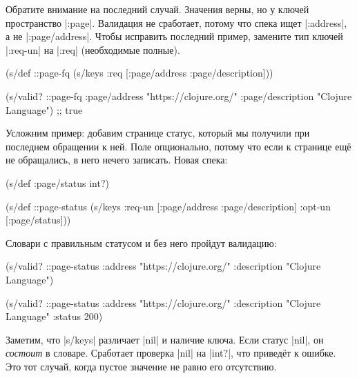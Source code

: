 Обратите внимание на последний случай. Значения верны, но у ключей пространство
\spverb|:page|. Валидация не сработает, потому что спека ищет \spverb|:address|,
а не \spverb|:page/address|. Чтобы исправить последний пример, замените тип
ключей \spverb|:req-un| на \spverb|:req| (необходимые полные).


\begin{english}
  \begin{clojure}
(s/def ::page-fq
  (s/keys :req [:page/address
                :page/description]))

(s/valid? ::page-fq
          {:page/address "https://clojure.org/"
           :page/description "Clojure Language"})
;; true
  \end{clojure}
\end{english}

Усложним пример: добавим странице статус, который мы получили при
последнем обращении к ней. Поле опционально, потому что если к странице ещ\"{е} не
обращались, в него нечего записать. Новая спека:

\begin{english}
  \begin{clojure}
(s/def :page/status int?)

(s/def ::page-status
  (s/keys :req-un [:page/address
                   :page/description]
          :opt-un [:page/status]))
  \end{clojure}
\end{english}

\noindent
Словари с правильным статусом и без него пройдут валидацию:

\begin{english}
  \begin{clojure}
(s/valid? ::page-status
          {:address "https://clojure.org/"
           :description "Clojure Language"})

(s/valid? ::page-status
          {:address "https://clojure.org/"
           :description "Clojure Language"
           :status 200})
  \end{clojure}
\end{english}


Заметим, что \spverb|s/keys| различает \spverb|nil| и наличие ключа. Если статус
\spverb|nil|, он \emph{состоит} в словаре. Сработает проверка \spverb|nil| на
\spverb|int?|, что привед\"{е}т к ошибке. Это тот случай, когда пустое значение
не равно его отсутствию.

